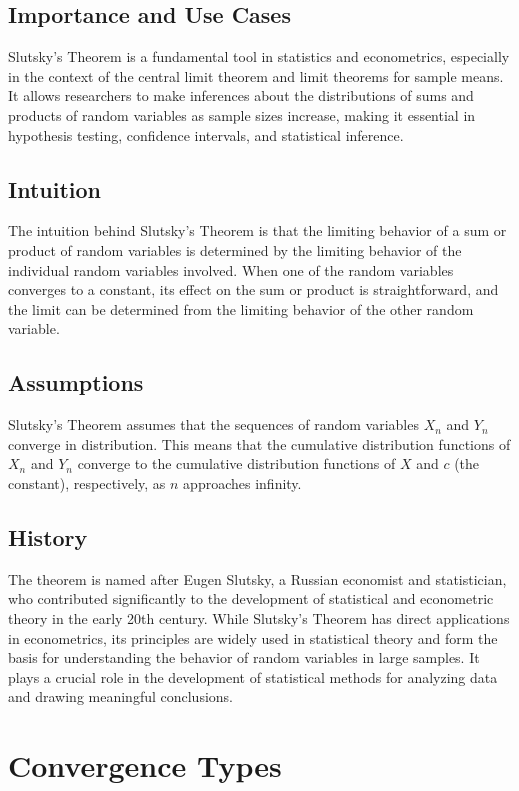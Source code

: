 \documentclass{article}
\begin{document}
\subsection{Importance and Use Cases}
Slutsky's Theorem is a fundamental tool in statistics and econometrics, especially in the context of the central limit theorem and limit theorems for sample means. It allows researchers to make inferences about the distributions of sums and products of random variables as sample sizes increase, making it essential in hypothesis testing, confidence intervals, and statistical inference.

\subsection{Intuition}
The intuition behind Slutsky's Theorem is that the limiting behavior of a sum or product of random variables is determined by the limiting behavior of the individual random variables involved. When one of the random variables converges to a constant, its effect on the sum or product is straightforward, and the limit can be determined from the limiting behavior of the other random variable.

\subsection{Assumptions}
Slutsky's Theorem assumes that the sequences of random variables \(X_n\) and \(Y_n\) converge in distribution. This means that the cumulative distribution functions of \(X_n\) and \(Y_n\) converge to the cumulative distribution functions of \(X\) and \(c\) (the constant), respectively, as \(n\) approaches infinity.

\subsection{History}
The theorem is named after Eugen Slutsky, a Russian economist and statistician, who contributed significantly to the development of statistical and econometric theory in the early 20th century. While Slutsky's Theorem has direct applications in econometrics, its principles are widely used in statistical theory and form the basis for understanding the behavior of random variables in large samples. It plays a crucial role in the development of statistical methods for analyzing data and drawing meaningful conclusions.

\section{Convergence Types}
\end{document}
